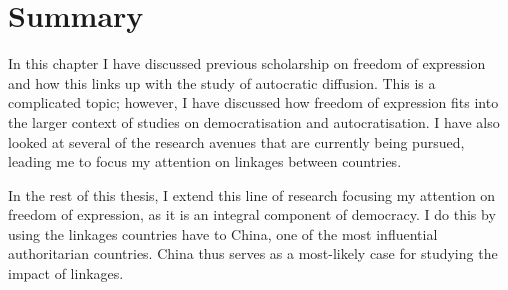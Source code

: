 \section{Summary}
In this chapter I have discussed previous scholarship on freedom of expression and how this links up with the study of autocratic diffusion. This is a complicated topic; however, I have discussed how freedom of expression fits into the larger context of studies on democratisation and autocratisation. I have also looked at several of the research avenues that are currently being pursued, leading me to focus my attention on linkages between countries. 

In the rest of this thesis, I extend this line of research focusing my attention on freedom of expression, as it is an integral component of democracy. I do this by using the linkages countries have to China, one of the most influential authoritarian countries. China thus serves as a most-likely case for studying the impact of linkages.
